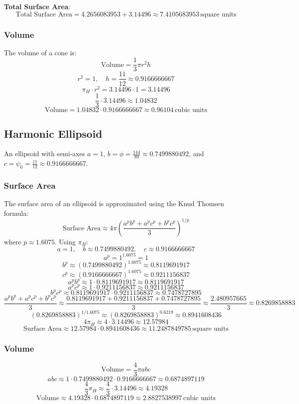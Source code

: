 \textbf{Total Surface Area}:
\[
\text{Total Surface Area} = 4.2656083953 + 3.14496 \approx 7.4105683953 \, \text{square units}
\]

\subsubsection{Volume}
The volume of a cone is:
\[
\text{Volume} = \frac{1}{3} \pi r^2 h
\]
\[
r^2 = 1, \quad h = \frac{11}{12} \approx 0.9166666667
\]
\[
\pi_H \cdot r^2 = 3.14496 \cdot 1 = 3.14496
\]
\[
\frac{1}{3} \cdot 3.14496 \approx 1.04832
\]
\[
\text{Volume} = 1.04832 \cdot 0.9166666667 \approx 0.96104 \, \text{cubic units}
\]

\subsection{Harmonic Ellipsoid}
An ellipsoid with semi-axes \( a = 1 \), \( b = \phi = \frac{144}{89} \approx 0.7499880492 \), and \( c = \psi_0 = \frac{11}{12} \approx 0.9166666667 \).

\subsubsection{Surface Area}
The surface area of an ellipsoid is approximated using the Knud Thomsen formula:
\[
\text{Surface Area} \approx 4 \pi \left( \frac{a^p b^p + a^p c^p + b^p c^p}{3} \right)^{1/p}
\]
where \( p \approx 1.6075 \). Using \(\pi_H\):
\[
a = 1, \quad b \approx 0.7499880492, \quad c \approx 0.9166666667
\]
\[
a^p = 1^{1.6075} = 1
\]
\[
b^p \approx (0.7499880492)^{1.6075} \approx 0.8119691917
\]
\[
c^p \approx (0.9166666667)^{1.6075} \approx 0.9211156837
\]
\[
a^p b^p \approx 1 \cdot 0.8119691917 \approx 0.8119691917
\]
\[
a^p c^p \approx 1 \cdot 0.9211156837 \approx 0.9211156837
\]
\[
b^p c^p \approx 0.8119691917 \cdot 0.9211156837 \approx 0.7478727895
\]
\[
\frac{a^p b^p + a^p c^p + b^p c^p}{3} \approx \frac{0.8119691917 + 0.9211156837 + 0.7478727895}{3} \approx \frac{2.480957665}{3} \approx 0.8269858883
\]
\[
\left(0.8269858883\right)^{1/1.6075} \approx (0.8269858883)^{0.6219} \approx 0.8941608436
\]
\[
4 \pi_H \approx 4 \cdot 3.14496 \approx 12.57984
\]
\[
\text{Surface Area} \approx 12.57984 \cdot 0.8941608436 \approx 11.2487849785 \, \text{square units}
\]

\subsubsection{Volume}
\[
\text{Volume} = \frac{4}{3} \pi a b c
\]
\[
a b c \approx 1 \cdot 0.7499880492 \cdot 0.9166666667 \approx 0.6874897119
\]
\[
\frac{4}{3} \pi_H \approx \frac{4}{3} \cdot 3.14496 \approx 4.19328
\]
\[
\text{Volume} \approx 4.19328 \cdot 0.6874897119 \approx 2.8827538997 \, \text{cubic units}
\]

